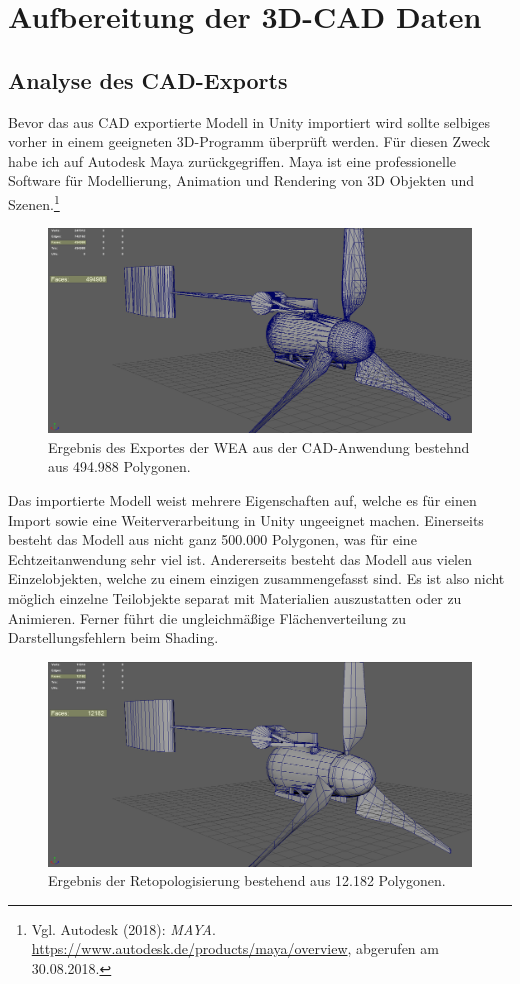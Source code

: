 \section{Aufbereitung der 3D-CAD Daten}
\label{sec:AufbereitungDer3D-CADDaten}



\subsection{Analyse des CAD-Exports}
\label{subsec:AnalyseDesCAD-Exports}
Bevor das aus CAD exportierte Modell in Unity importiert wird sollte selbiges vorher in einem geeigneten 3D-Programm überprüft werden. Für diesen Zweck habe ich auf Autodesk Maya zurückgegriffen. Maya ist eine professionelle Software für Modellierung, Animation und Rendering von 3D Objekten und Szenen.\footnote{Vgl. Autodesk  (2018): \textit{MAYA}.\newline
\url{https://www.autodesk.de/products/maya/overview},\newline 
abgerufen am 30.08.2018.}
\begin{figure}[H]
	\centering
	\captionsetup{width=1\textwidth}
	\includegraphics[keepaspectratio, width=1\textwidth]{bildquellen/WEA-Vergleich1}
	\caption{Ergebnis des Exportes der WEA aus der CAD-Anwendung bestehnd aus 494.988 Polygonen.}
	\label{fig:2.1}
\end{figure}
Das importierte Modell  weist mehrere Eigenschaften auf, welche es für einen Import sowie eine Weiterverarbeitung in Unity ungeeignet machen. Einerseits besteht das Modell aus nicht ganz 500.000 Polygonen, was für eine Echtzeitanwendung sehr viel ist. 
Andererseits besteht das Modell aus vielen Einzelobjekten, welche zu einem einzigen zusammengefasst sind. Es ist also nicht möglich einzelne Teilobjekte separat mit Materialien auszustatten oder zu Animieren.  
Ferner führt die ungleichmäßige Flächenverteilung zu Darstellungsfehlern beim Shading.



\begin{figure}[H]
	\centering
	\captionsetup{width=1\textwidth}
	\includegraphics[keepaspectratio, width=1\textwidth]{bildquellen/WEA-Vergleich2}
	\caption{Ergebnis der Retopologisierung bestehend aus 12.182 Polygonen.}
	\label{fig:2.2}
\end{figure}
